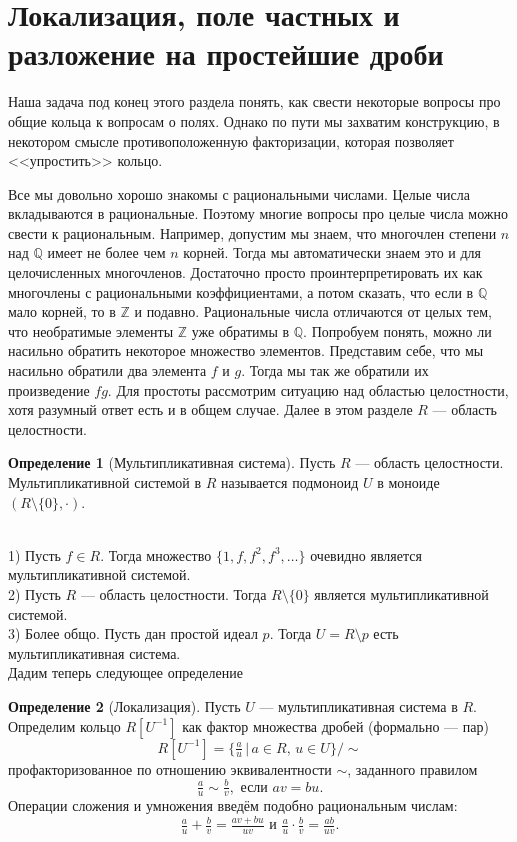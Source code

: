 \documentclass[10pt,a4paper,oneside]{book}
\theoremstyle{definition}
\newtheorem{defn}{Определение}
\newcommand{\mb}[1]{\mathbb{#1}}
\def\exm{\noindent {\bf Примеры:}}
\def\dfn{\begin{defn}}
\def\edfn{\end{defn}}
\begin{document}
\section{Локализация, поле частных и разложение на простейшие дроби}

Наша задача под конец этого раздела понять, как свести некоторые вопросы про общие кольца к вопросам о полях. Однако по пути мы захватим конструкцию, в некотором смысле противоположенную факторизации, которая позволяет <<упростить>> кольцо.

Все мы довольно хорошо знакомы с рациональными числами. Целые числа вкладываются в рациональные. Поэтому
многие вопросы про целые числа можно свести к рациональным. Например, допустим мы знаем, что многочлен
степени $n$ над $\mb Q$ имеет не более чем $n$ корней. Тогда мы автоматически знаем это и для целочисленных многочленов.
Достаточно просто проинтерпретировать их как многочлены с рациональными коэффициентами, а потом сказать, что
если в $\mb Q$ мало корней, то в $\mb Z$ и подавно.
Рациональные числа отличаются от целых тем, что необратимые элементы $\mb Z$ уже обратимы в $\mb Q$. Попробуем понять, можно
ли насильно обратить некоторое множество элементов. Представим себе, что мы насильно обратили два элемента $f$ и
$g$. Тогда мы так же обратили их произведение $fg$. Для простоты рассмотрим ситуацию над областью целостности, хотя разумный ответ есть и в общем случае. Далее в этом разделе $R$ --- область целостности.

\dfn[Мультипликативная система] Пусть $R$ --- область целостности. Мультипликативной системой  в $R$ называется
подмоноид $U$ в моноиде $(R\setminus\{0\},\cdot)$.
\edfn

\exm\\
1) Пусть $f\in R$. Тогда множество $\{1,f,f^2,f^3,\dots\}$ очевидно является мультипликативной системой.\\
2) Пусть $R$ --- область целостности. Тогда $R\setminus \{0\}$ является мультипликативной системой.\\
3) Более общо. Пусть дан простой идеал $p$. Тогда $U=R\setminus p$ есть мультипликативная система.\\

Дадим теперь следующее определение
\dfn[Локализация] Пусть $U$ --- мультипликативная система в $R$. Определим кольцо $R[U^{-1}]$ как
фактор множества дробей (формально --- пар)
$$ R[U^{-1}]=\{ \tfrac{a}{u}\,|\, a\in R, \, u\in U\}/\sim$$
профакторизованное по отношению эквивалентности $\sim$, заданного правилом
$$ \tfrac{a}{u}\sim \tfrac{b}{v}, \text{ если } av=bu.$$
Операции сложения и умножения введём подобно рациональным числам:
$$ \tfrac{a}{u}+\tfrac{b}{v}=\tfrac{av+bu}{uv} \text{ и } \tfrac{a}{u}\cdot\tfrac{b}{v}=\tfrac{ab}{uv}.$$
\edfn
\end{document}
